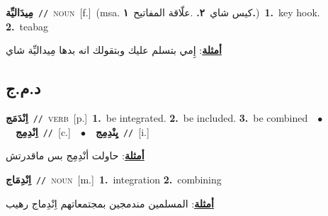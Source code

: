 \documentclass[10pt,a4paper,twoside]{article} %
\begin{document}
\begin{multicols}{2}
{\setlength\topsep{0pt}\textbf{\foreignlanguage{arabic}{مِيدَاليِّة}}\ {\color{gray}\texttt{//}\color{black}}\ \textsc{noun}\ [f.]\ \color{gray}(msa. \foreignlanguage{arabic}{كيس شاي}~\foreignlanguage{arabic}{\textbf{٢.}}  .\foreignlanguage{arabic}{علّاقة المفاتيح}~\foreignlanguage{arabic}{\textbf{١.}})\color{black}\ \textbf{1.}~key hook.  \textbf{2.}~teabag\  \begin{flushright}\color{gray}\foreignlanguage{arabic}{\textbf{\underline{\foreignlanguage{arabic}{أمثلة}}}: إِمي بتسلم عليك وبتقولك انه بدها مِيداليِّة شاي}\end{flushright}\color{black}} \vspace{2mm}

\vspace{-3mm}
\subsection*{\color{blue}\foreignlanguage{arabic}{د.م.ج}\color{blue}{}} 

{\setlength\topsep{0pt}\textbf{\foreignlanguage{arabic}{اِنْدَمَج}}\ {\color{gray}\texttt{//}\color{black}}\ \textsc{verb}\ [p.]\ \textbf{1.}~be integrated.  \textbf{2.}~be included.  \textbf{3.}~be combined\ \ $\bullet$\ \ \setlength\topsep{0pt}\textbf{\foreignlanguage{arabic}{اِنْدِمِج}}\ {\color{gray}\texttt{//}\color{black}}\ [c.]\ \ $\bullet$\ \ \setlength\topsep{0pt}\textbf{\foreignlanguage{arabic}{يِنْدِمِج}}\ {\color{gray}\texttt{//}\color{black}}\ [i.]\  \begin{flushright}\color{gray}\foreignlanguage{arabic}{\textbf{\underline{\foreignlanguage{arabic}{أمثلة}}}: حاولت أنْدِمِج بس ماقدرتش}\end{flushright}\color{black}} \vspace{2mm}

{\setlength\topsep{0pt}\textbf{\foreignlanguage{arabic}{اِنْدِمَاج}}\ {\color{gray}\texttt{//}\color{black}}\ \textsc{noun}\ [m.]\ \textbf{1.}~integration  \textbf{2.}~combining\  \begin{flushright}\color{gray}\foreignlanguage{arabic}{\textbf{\underline{\foreignlanguage{arabic}{أمثلة}}}: المسلمين مندمجين بمجتمعاتهم اِنْدِماج رهيب}\end{flushright}\color{black}} \vspace{2mm}


\end{multicols}
\end{document}
